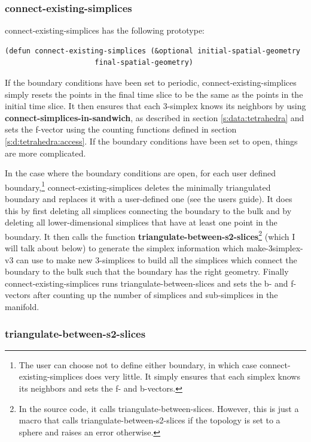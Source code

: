 \message{ !name(programmers_guide.tex)}\documentclass[12pt]{article}
\begin{document}
\subsubsection{connect-existing-simplices}

connect-existing-simplices has the following prototype:
\begin{small}
\begin{lstlisting}
(defun connect-existing-simplices (&optional initial-spatial-geometry 
				     final-spatial-geometry)
\end{lstlisting}
\end{small}
If the boundary conditions have been set to periodic,
connect-existing-simplices simply resets the points in the final time
slice to be the same as the points in the initial time slice. It then
ensures that each 3-simplex knows its neighbors by using
\textbf{connect-simplices-in-sandwich}, as described in section
\ref{s:data:tetrahedra} and sets the f-vector using the counting
functions defined in section \ref{s:d:tetrahedra:access}. If the
boundary conditions have been set to open, things are more
complicated.

In the case where the boundary conditions are open, for each user
defined boundary,\footnote{The user can choose not to define either
  boundary, in which case connect-existing-simplices does very
  little. It simply ensures that each simplex knows its neighbors and
  sets the f- and b-vectors.}  connect-existing-simplices deletes the
minimally triangulated boundary and replaces it with a user-defined
one (see the users guide). It does this by first deleting all
simplices connecting the boundary to the bulk and by deleting all
lower-dimensional simplices that have at least one point in the
boundary. It then calls the function
\textbf{triangulate-between-s2-slices}\footnote{In the source code, it
  calls triangulate-between-slices. However, this is just a macro that
  calls triangulate-between-s2-slices if the topology is set to a
  sphere and raises an error otherwise.} (which I will talk about
below) to generate the simplex information which make-3simplex-v3 can
use to make new 3-simplices to build all the simplices which connect
the boundary to the bulk such that the boundary has the right
geometry. Finally connect-existing-simplices runs
triangulate-between-slices and sets the b- and f-vectors after
counting up the number of simplices and sub-simplices in the manifold.

\subsubsection{triangulate-between-s2-slices}
\label{sss:triangulate-between-slices}
\end{document}
